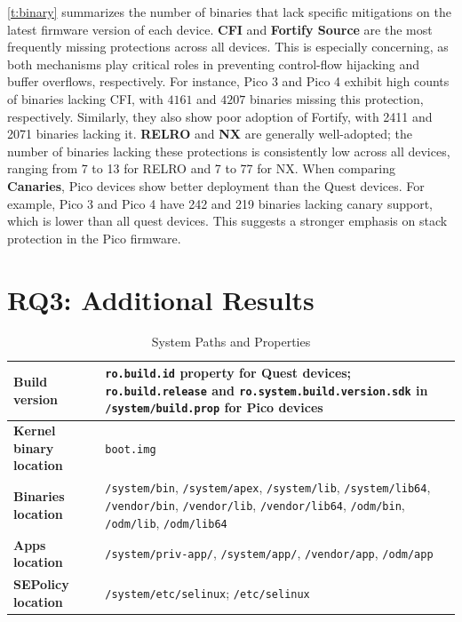 \documentclass[sigconf]{acmart}
\newcounter{note}[section]
\begin{document}
\autoref{t:binary} summarizes the number of binaries that lack specific mitigations on the latest firmware version of each device. 
{\bf CFI} and {\bf Fortify Source} are the most frequently missing protections across all devices. This is especially concerning, as both mechanisms play critical roles in preventing control-flow hijacking and buffer overflows, respectively.
For instance, Pico 3 and Pico 4 exhibit high counts of binaries lacking CFI, with $4161$ and $4207$ binaries missing this protection, respectively. Similarly, they also show poor adoption of Fortify, with 2411 and 2071 binaries lacking it. 
{\bf RELRO}  and {\bf NX} are generally well-adopted; 
the number of binaries lacking these protections is consistently low across all devices, ranging from 7 to 13 for RELRO and 7 to 77 for NX. 
When comparing {\bf Canaries}, Pico devices show better deployment than the Quest devices. 
For example, Pico 3 and Pico 4 have 242 and 219 binaries lacking canary support, which is lower than all quest devices. 
This suggests a stronger emphasis on stack protection in the Pico firmware.

\section{RQ3: Additional Results}
\label{sec:app:rq3}

\begin{table}[ht]
\centering
\footnotesize
\begin{tabular}{ll}\toprule
\textbf{Build version} & \texttt{ro.build.id} property for Quest devices; \texttt{ro.build.release} and \texttt{ro.system.build.version.sdk} in \texttt{/system/build.prop} for Pico devices \\ \hline
\textbf{Kernel binary location}   & \texttt{boot.img} \\ \hline
\textbf{Binaries location}        & \texttt{/system/bin}, \texttt{/system/apex}, \texttt{/system/lib}, \texttt{/system/lib64}, \texttt{/vendor/bin}, \texttt{/vendor/lib}, \texttt{/vendor/lib64}, \texttt{/odm/bin}, \texttt{/odm/lib}, \texttt{/odm/lib64} \\ \hline
\textbf{Apps location}            & \texttt{/system/priv-app/}, \texttt{/system/app/}, \texttt{/vendor/app}, \texttt{/odm/app} \\ \hline
\textbf{SEPolicy location}        & \texttt{/system/etc/selinux}; \texttt{/etc/selinux} \\
\bottomrule
\end{tabular}
\caption{System Paths and Properties}
\label{t:system_paths}
\vspace{-10pt}
\end{table}
\end{document}

